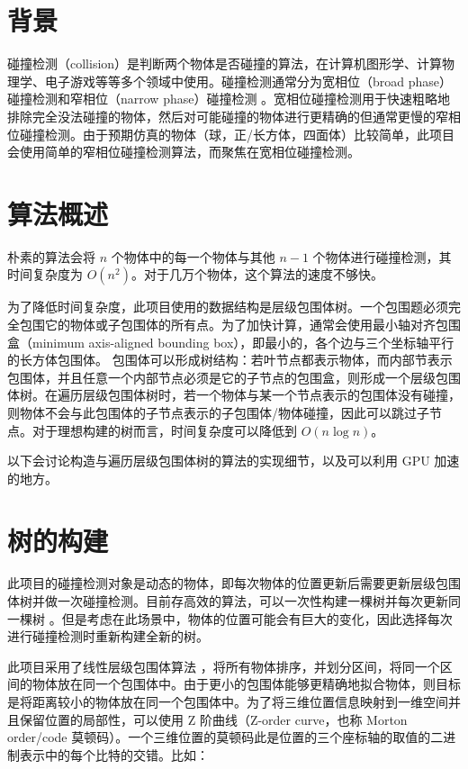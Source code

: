 \section{背景}

碰撞检测（collision）是判断两个物体是否碰撞的算法，在计算机图形学、计算物理学、电子游戏等等多个领域中使用。碰撞检测通常分为宽相位（broad phase）碰撞检测和窄相位（narrow phase）碰撞检测 \cite{nvidiaCollisionDetection}。宽相位碰撞检测用于快速粗略地排除完全没法碰撞的物体，然后对可能碰撞的物体进行更精确的但通常更慢的窄相位碰撞检测。由于预期仿真的物体（球，正/长方体，四面体）比较简单，此项目会使用简单的窄相位碰撞检测算法，而聚焦在宽相位碰撞检测。

\section{算法概述}

朴素的算法会将 $n$ 个物体中的每一个物体与其他 $n-1$ 个物体进行碰撞检测，其时间复杂度为 $O(n^2)$。对于几万个物体，这个算法的速度不够快。

为了降低时间复杂度，此项目使用的数据结构是层级包围体树。一个包围题必须完全包围它的物体或子包围体的所有点。为了加快计算，通常会使用最小轴对齐包围盒（minimum axis-aligned bounding box），即最小的，各个边与三个坐标轴平行的长方体包围体。
包围体可以形成树结构：若叶节点都表示物体，而内部节表示包围体，并且任意一个内部节点必须是它的子节点的包围盒，则形成一个层级包围体树。在遍历层级包围体树时，若一个物体与某一个节点表示的包围体没有碰撞，则物体不会与此包围体的子节点表示的子包围体/物体碰撞，因此可以跳过子节点。对于理想构建的树而言，时间复杂度可以降低到 $O(n\log n)$。

以下会讨论构造与遍历层级包围体树的算法的实现细节，以及可以利用 GPU 加速的地方。

\section{树的构建}

此项目的碰撞检测对象是动态的物体，即每次物体的位置更新后需要更新层级包围体树并做一次碰撞检测。目前存高效的算法，可以一次性构建一棵树并每次更新同一棵树 \cite{Wald2008}。但是考虑在此场景中，物体的位置可能会有巨大的变化，因此选择每次进行碰撞检测时重新构建全新的树。

此项目采用了线性层级包围体算法 \cite{nvidiaTreeConstruction} \cite{Lauterbach2009}，将所有物体排序，并划分区间，将同一个区间的物体放在同一个包围体中。由于更小的包围体能够更精确地拟合物体，则目标是将距离较小的物体放在同一个包围体中。为了将三维位置信息映射到一维空间并且保留位置的局部性，可以使用 Z 阶曲线（Z-order curve，也称 Morton order/code 莫顿码）\cite{wikipediaZorderCurve}。一个三维位置的莫顿码此是位置的三个座标轴的取值的二进制表示中的每个比特的交错。比如：

